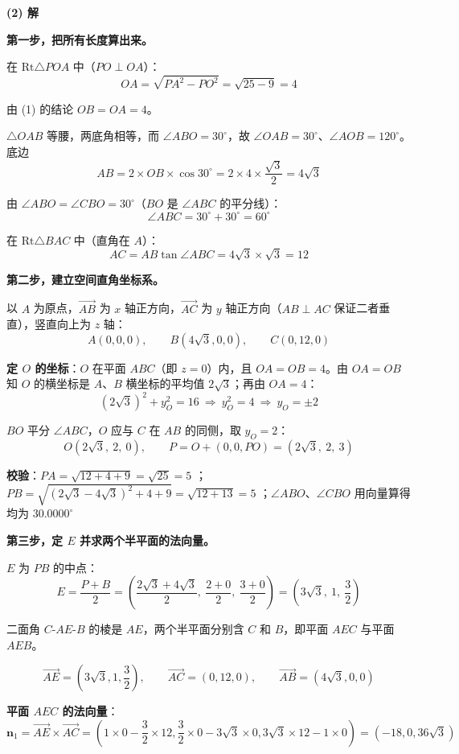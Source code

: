 \textbf{(2) 解}

\textbf{第一步，把所有长度算出来。}

在 $\mathrm{Rt}\triangle POA$ 中（$PO\perp OA$）：
\[OA=\sqrt{PA^{2}-PO^{2}}=\sqrt{25-9}=4\]

由 (1) 的结论 $OB=OA=4$。

$\triangle OAB$ 等腰，两底角相等，而 $\angle ABO=30^\circ$，故 $\angle OAB=30^\circ$、$\angle AOB=120^\circ$。底边
\[AB=2\times OB\times\cos30^\circ=2\times4\times\frac{\sqrt3}2=4\sqrt3\]

由 $\angle ABO=\angle CBO=30^\circ$（$BO$ 是 $\angle ABC$ 的平分线）：
\[\angle ABC=30^\circ+30^\circ=60^\circ\]

在 $\mathrm{Rt}\triangle BAC$ 中（直角在 $A$）：
\[AC=AB\tan\angle ABC=4\sqrt3\times\sqrt3=12\]

\textbf{第二步，建立空间直角坐标系。}

以 $A$ 为原点，$\overrightarrow{AB}$ 为 $x$ 轴正方向，$\overrightarrow{AC}$ 为 $y$ 轴正方向（$AB\perp AC$ 保证二者垂直），竖直向上为 $z$ 轴：
\[A(0,0,0),\qquad B\left(4\sqrt3,0,0\right),\qquad C(0,12,0)\]

\textbf{定 $O$ 的坐标}：$O$ 在平面 $ABC$（即 $z=0$）内，且 $OA=OB=4$。由 $OA=OB$ 知 $O$ 的横坐标是 $A$、$B$ 横坐标的平均值 $2\sqrt3$；再由 $OA=4$：
\[\left(2\sqrt3\right)^{2}+y_O^{2}=16\ \Longrightarrow\ y_O^{2}=4\ \Longrightarrow\ y_O=\pm2\]

$BO$ 平分 $\angle ABC$，$O$ 应与 $C$ 在 $AB$ 的同侧，取 $y_O=2$：
\[O\left(2\sqrt3,\ 2,\ 0\right),\qquad P=O+(0,0,PO)=\left(2\sqrt3,\ 2,\ 3\right)\]

\textbf{校验}：$PA=\sqrt{12+4+9}=\sqrt{25}=5$ ；$PB=\sqrt{\left(2\sqrt3-4\sqrt3\right)^{2}+4+9}=\sqrt{12+13}=5$ ；$\angle ABO$、$\angle CBO$ 用向量算得均为 $30.0000^\circ$ 

\textbf{第三步，定 $E$ 并求两个半平面的法向量。}

$E$ 为 $PB$ 的中点：
\[E=\frac{P+B}2=\left(\frac{2\sqrt3+4\sqrt3}2,\ \frac{2+0}2,\ \frac{3+0}2\right)=\left(3\sqrt3,\ 1,\ \frac32\right)\]

二面角 $C\text{-}AE\text{-}B$ 的棱是 $AE$，两个半平面分别含 $C$ 和 $B$，即平面 $AEC$ 与平面 $AEB$。

\[\overrightarrow{AE}=\left(3\sqrt3,1,\frac32\right),\qquad\overrightarrow{AC}=(0,12,0),\qquad\overrightarrow{AB}=\left(4\sqrt3,0,0\right)\]

\textbf{平面 $AEC$ 的法向量}：
\[\boldsymbol n_1=\overrightarrow{AE}\times\overrightarrow{AC}=\left(1\times0-\frac32\times12,\frac32\times0-3\sqrt3\times0,3\sqrt3\times12-1\times0\right)=\left(-18,0,36\sqrt3\right)\]

